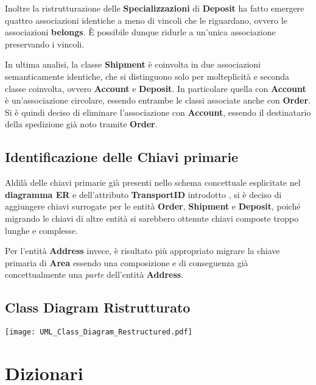 Inoltre la ristrutturazione delle \textbf{Specializzazioni} di \textbf{Deposit} ha fatto emergere quattro associazioni identiche a meno di vincoli che le riguardano, ovvero le associazioni \textbf{belongs}. È possibile dunque ridurle a un'unica associazione preservando i vincoli.

In ultima analisi, la classe \textbf{Shipment} è coinvolta in due associazioni semanticamente identiche, che si distinguono solo per molteplicità e seconda classe coinvolta, ovvero \textbf{Account} e \textbf{Deposit}. In particolare quella con \textbf{Account} è un'associazione circolare, essendo entrambe le classi associate anche con \textbf{Order}. Si è quindi deciso di eliminare l'associazione con \textbf{Account}, essendo il destinatario della spedizione già noto tramite \textbf{Order}.

\subsection{Identificazione delle Chiavi primarie}\label{individuazioneDelleChiaviPrimarie}

Aldilà delle chiavi primarie già presenti nello schema concettuale esplicitate nel \textbf{diagramma ER} e dell'attributo \textbf{TransportID} introdotto , si è deciso di aggiungere chiavi surrogate per le entità \textbf{Order}, \textbf{Shipment} e \textbf{Deposit}, poiché migrando le chiavi di altre entità si sarebbero ottenute chiavi composte troppo lunghe e complesse.

Per l'entità \textbf{Address} invece, è risultato più appropriato migrare la chiave primaria di \textbf{Area} essendo una composizione e di conseguenza già concettualmente una \textit{parte} dell'entità \textbf{Address}. 

\newpage

\subsection{Class Diagram Ristrutturato}

\begin{center}
  \texttt{[image: UML\_Class\_Diagram\_Restructured.pdf]} 
\end{center}

\newpage

\section{Dizionari}

